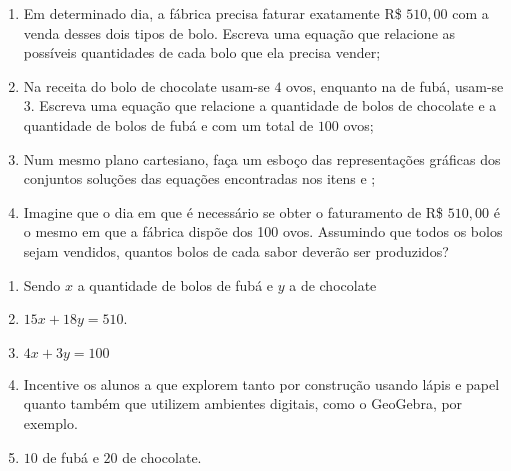 \documentclass[10 pt,usenames,dvipsnames, oneside]{article}
\begin{document}
\begin{enumerate}
\item{}
Em determinado dia, a fábrica precisa faturar exatamente R\$ $510{,}00$ com a venda desses dois tipos de bolo. Escreva uma equação que relacione as possíveis quantidades de cada bolo que ela precisa vender;

\item{}
Na receita do bolo de chocolate usam-se $4$ ovos, enquanto na de fubá, usam-se $3$. Escreva uma equação que relacione a quantidade de bolos de chocolate e a quantidade de bolos de fubá e com um total de $100$ ovos;

\item{}
Num mesmo plano cartesiano, faça um esboço das representações gráficas dos conjuntos soluções das equações encontradas nos itens  e ;

\item{}
Imagine que o dia em que é necessário se obter o faturamento de R\$ $510{,}00$ é o mesmo em que a fábrica dispõe dos 100 ovos. Assumindo que todos os bolos sejam vendidos, quantos bolos de cada sabor deverão ser produzidos?
\end{enumerate}

\ifdefined\prof
\begin{solucao}

\begin{enumerate}
\item Sendo $x$ a quantidade de bolos de fubá e $y$ a de chocolate
\item $15x+18y =510$.
\item $4x+3y=100$
\item Incentive os alunos a que explorem tanto por construção usando lápis e papel quanto também que utilizem ambientes digitais, como o GeoGebra, por exemplo.
\item $10$ de fubá e $20$ de chocolate.
\end{enumerate}

\end{solucao}
\fi
\end{document}
